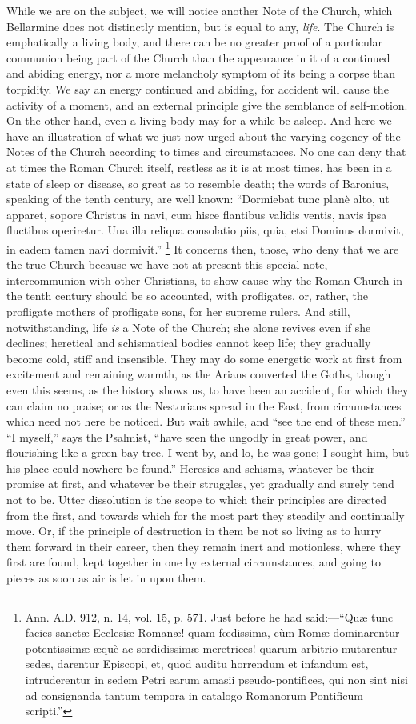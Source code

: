 While we are on the subject, we will notice
another Note of the Church, which Bellarmine does not distinctly
mention, but is equal to any, \emph{life}. The Church is emphatically
a living body, and there can be no greater proof of a particular
communion being part of the Church than the appearance in it of a
continued and abiding energy, nor a more melancholy symptom of its
being a corpse than torpidity. We say an energy continued and abiding,
for accident will cause the activity of a moment, and an external
principle give the semblance of self-motion. On the other hand, even a
living body may for a while be asleep. And here we have an
illustration of what we just now urged about the varying cogency of
the Notes of the Church according to times and circumstances. No one
can deny that at times the Roman Church itself, restless as it is at
most times, has been in a state of sleep or disease, so great as to
resemble death; the words of Baronius, speaking of the tenth century,
are well known: ``Dormiebat tunc planè alto, ut apparet, sopore
Christus in navi, cum hisce flantibus validis ventis, navis ipsa
fluctibus operiretur. Una illa reliqua consolatio piis, quia, etsi
Dominus dormivit, in eadem tamen navi dormivit.'' \footnote{Ann. A.D.
912, n. 14, vol. 15, p. 571. Just before he had said:—``Quæ tunc
facies sanctæ Ecclesiæ Romanæ! quam fœdissima, cùm Romæ
dominarentur potentissimæ æquè ac sordidissimæ meretrices! quarum
arbitrio mutarentur sedes, darentur Episcopi, et, quod auditu
horrendum et infandum est, intruderentur in sedem Petri earum amasii
pseudo-pontifices, qui non sint nisi ad consignanda tantum tempora in
catalogo Romanorum Pontificum scripti.''} It
concerns then, those, who deny that we are the true Church
because we have not at present this special note, intercommunion with
other Christians, to show cause why the Roman Church in the tenth
century should be so accounted, with profligates, or, rather, the
profligate mothers of profligate sons, for her supreme rulers. And
still, notwithstanding, life \emph{is} a Note of the Church; she alone
revives even if she declines; heretical and schismatical bodies cannot
keep life; they gradually become cold, stiff and insensible. They may
do some energetic work at first from excitement and remaining warmth,
as the Arians converted the Goths, though even this seems, as the
history shows us, to have been an accident, for which they can claim
no praise; or as the Nestorians spread in the East, from circumstances
which need not here be noticed. But wait awhile, and ``see the end of
these men.'' ``I myself,'' says the Psalmist, ``have seen the
ungodly in great power, and flourishing like a green-bay tree. I went
by, and lo, he was gone; I sought him, but his place could nowhere be
found.'' Heresies and schisms, whatever be their promise at first,
and whatever be their struggles, yet gradually and surely tend not to
be. Utter dissolution is the scope to which their principles are
directed from the first, and towards which for the most part they
steadily and continually move. Or, if the principle of destruction in
them be not so living as to hurry them forward in their career, then
they remain inert and motionless, where they first are found, kept
together in one by external circumstances, and going to pieces as soon
as air is let in upon them.

